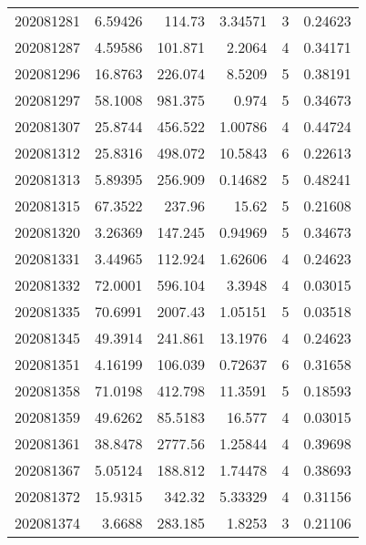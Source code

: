 \begin{tabular}{rrrrrr}
 202081281 &          6.59426 &      114.73   &            3.34571 &           3 & 0.24623 \\
 202081287 &          4.59586 &      101.871  &            2.2064  &           4 & 0.34171 \\
 202081296 &         16.8763  &      226.074  &            8.5209  &           5 & 0.38191 \\
 202081297 &         58.1008  &      981.375  &            0.974   &           5 & 0.34673 \\
 202081307 &         25.8744  &      456.522  &            1.00786 &           4 & 0.44724 \\
 202081312 &         25.8316  &      498.072  &           10.5843  &           6 & 0.22613 \\
 202081313 &          5.89395 &      256.909  &            0.14682 &           5 & 0.48241 \\
 202081315 &         67.3522  &      237.96   &           15.62    &           5 & 0.21608 \\
 202081320 &          3.26369 &      147.245  &            0.94969 &           5 & 0.34673 \\
 202081331 &          3.44965 &      112.924  &            1.62606 &           4 & 0.24623 \\
 202081332 &         72.0001  &      596.104  &            3.3948  &           4 & 0.03015 \\
 202081335 &         70.6991  &     2007.43   &            1.05151 &           5 & 0.03518 \\
 202081345 &         49.3914  &      241.861  &           13.1976  &           4 & 0.24623 \\
 202081351 &          4.16199 &      106.039  &            0.72637 &           6 & 0.31658 \\
 202081358 &         71.0198  &      412.798  &           11.3591  &           5 & 0.18593 \\
 202081359 &         49.6262  &       85.5183 &           16.577   &           4 & 0.03015 \\
 202081361 &         38.8478  &     2777.56   &            1.25844 &           4 & 0.39698 \\
 202081367 &          5.05124 &      188.812  &            1.74478 &           4 & 0.38693 \\
 202081372 &         15.9315  &      342.32   &            5.33329 &           4 & 0.31156 \\
 202081374 &          3.6688  &      283.185  &            1.8253  &           3 & 0.21106 \\

\end{tabular}
